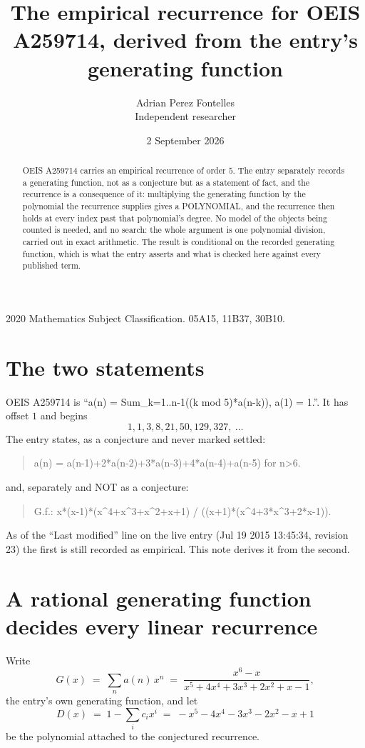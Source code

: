\documentclass[11pt,a4paper]{article}
\title{The empirical recurrence for OEIS A259714, derived from the entry's generating function}
\author{Adrian Perez Fontelles\\ \small Independent researcher}
\date{2 September 2026}
\theoremstyle{plain}
\theoremstyle{definition}
\begin{document}
\maketitle

\begin{abstract}
OEIS A259714 carries an empirical recurrence of order $5$. The entry separately records a
generating function, not as a conjecture but as a statement of fact, and the recurrence is a
consequence of it: multiplying the generating function by the polynomial the recurrence
supplies gives a POLYNOMIAL, and the recurrence then holds at every index past that
polynomial's degree. No model of the objects being counted is needed, and no search: the
whole argument is one polynomial division, carried out in exact arithmetic. The result is
conditional on the recorded generating function, which is what the entry asserts and what is
checked here against every published term.
\end{abstract}

\noindent\small 2020 Mathematics Subject Classification. 05A15, 11B37, 30B10.\normalsize

\section{The two statements}

OEIS A259714 is ``a(n) = Sum\_{k=1..n-1}((k mod 5)*a(n-k)), a(1) = 1.''. It has offset $1$ and begins
\[
1, 1, 3, 8, 21, 50, 129, 327,\ \dots
\]
The entry states, as a conjecture and never marked settled:
\begin{quote}
a(n) = a(n-1)+2*a(n-2)+3*a(n-3)+4*a(n-4)+a(n-5) for n>6.
\end{quote}
and, separately and NOT as a conjecture:
\begin{quote}
G.f.: x*(x-1)*(x\^{}4+x\^{}3+x\^{}2+x+1) / ((x+1)*(x\^{}4+3*x\^{}3+2*x-1)).
\end{quote}
As of the ``Last modified'' line on the live entry (Jul 19 2015 13:45:34, revision 23) the first is still
recorded as empirical. This note derives it from the second.

\section{A rational generating function decides every linear recurrence}

Write
\[
G(x)\;=\;\sum_{n}a(n)\,x^{n}\;=\;\frac{x^{6} - x}{x^{5} + 4 x^{4} + 3 x^{3} + 2 x^{2} + x - 1},
\]
the entry's own generating function, and let
\[
D(x)\;=\;1-\sum_i c_i x^{i}\;=\;- x^{5} - 4 x^{4} - 3 x^{3} - 2 x^{2} - x + 1
\]
be the polynomial attached to the conjectured recurrence.
\end{document}
